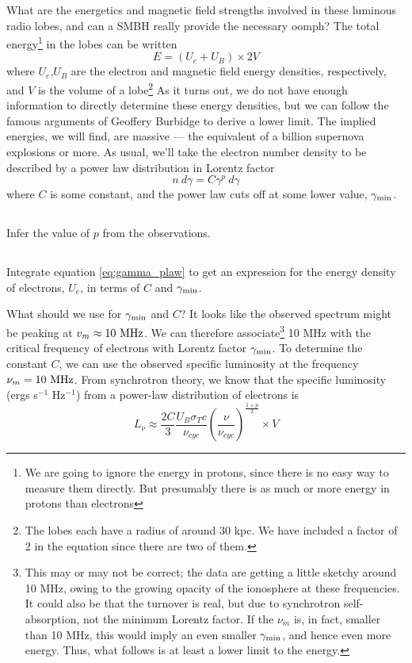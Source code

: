 \documentclass[11pt]{article}
\begin{document}
What are the energetics and magnetic field strengths involved in these luminous
radio lobes, and can a SMBH really provide the necessary oomph? The total
energy\footnote{We are going to ignore the energy in protons, since there is no 
easy way to measure them directly. But presumably there is as much or more 
energy in protons than electrons}
in the lobes can be written
\begin{equation}
E=(U_e+U_B)\times 2V
\end{equation}
where $U_e$,$U_B$ are the electron and magnetic field energy densities, respectively,
and $V$ is the volume of a lobe\footnote{The lobes each have a radius of around 30 kpc. 
We have included a factor of 2 in the equation since there are two of them.}
As it turns out, we do not have enough information to directly determine these energy densities, but 
we can follow the famous arguments of Geoffery Burbidge to derive a lower limit. The implied 
energies, we will find, are massive --- the equivalent of a billion supernova explosions or more.
As usual, we’ll take the electron number density to be described by a power law distribution in 
Lorentz factor
\begin{equation}
n~d\gamma=C\gamma^p~d\gamma
\label{eq:gamma_plaw}
\end{equation}
where $C$ is some constant, and the power law cuts off at some lower value, $\gamma_{\rm min}$.

\subsection{}
Infer the value of $p$ from the observations.

\subsection{}
Integrate equation \ref{eq:gamma_plaw} to get an expression for the energy density of
electrons, $U_e$, in terms of $C$ and $\gamma_{\rm min}$.

What should we use for $\gamma_{\rm min}$ and $C$?  It looks like the observed spectrum
might be peaking at $v_m\approx 10~{\rm MHz}$.  We can therefore associate\footnote{
This may or may not be correct; the data are getting a little sketchy around 10 MHz,
owing to the growing opacity of the ionosphere at these frequencies.  It could also
be that the turnover is real, but due to synchrotron self-absorption, not
the minimum Lorentz factor.  If the $\nu_m$ is, in fact, smaller than 10 MHz, this would
imply an even smaller $\gamma_{\rm min}$, and hence even more energy.  Thus, what
follows is at least a lower limit to the energy.}
10 MHz with the critical frequency of electrons with Lorentz factor $\gamma_{\rm min}$.  To
determine the constant $C$, we can use the observed specific luminosity at the frequency
$\nu_m=10~{\rm MHz}$.  From synchrotron theory, we know that the specific luminosity
(ergs s$^{-1}$ Hz$^{-1}$) from a power-law distribution of electrons is
\begin{equation}
L_\nu\approx\frac{2C}3\frac{U_B\sigma_Tc}{\nu_{cyc}}\left(\frac{\nu}{\nu_{cyc}}\right)^\frac{1+p}2\times V
\end{equation}
\end{document}
